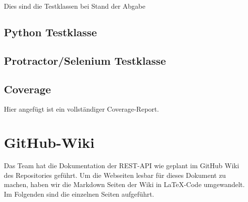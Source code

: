 \documentclass[accentcolor=tud0b,12pt,paper=a4]{tudreport}
\begin{document}
	Dies sind die Testklassen bei Stand der Abgabe

	\section{Python Testklasse}
	

	\section{Protractor/Selenium Testklasse}
	

	\section{Coverage}
	Hier angefügt ist ein vollständiger Coverage-Report.
	
	
	
	
	
	
	
	
	

\chapter{GitHub-Wiki}
	Das Team hat die Dokumentation der REST-API wie geplant im GitHub Wiki des Repositories geführt. Um die Webseiten lesbar für dieses Dokument zu machen, haben wir die Markdown Seiten der Wiki in \LaTeX-Code umgewandelt. Im Folgenden sind die einzelnen Seiten aufgeführt.

	
	
	
	
	
	
	
	
	
	
	
		
\end{document}
